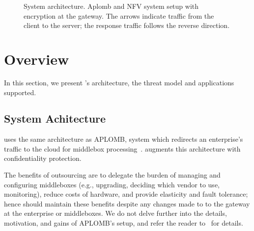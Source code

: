 
\begin{figure}[t!]
\centering
{}
%
\hfill  
{}
     
\caption{System architecture. Aplomb and NFV system setup with \sys encryption  at the gateway. The arrows indicate traffic from the client to the server; the response traffic follows the reverse direction. \label{fig:sys-overview}}
\end{figure}




     
\section{Overview}\label{sec:overview}








In this section, we present \sys's architecture, the threat model and applications supported.


\subsection{System Achitecture}

\sys uses the same  architecture as APLOMB, system which redirects an enterprise's traffic to the cloud for middlebox processing~\cite{aplomb}. \sys augments this architecture with confidentiality protection.

The benefits of outsourcing are to delegate the burden of managing and configuring
middleboxes (e.g., upgrading, deciding which vendor to use, monitoring), reduce costs of hardware,
and provide elasticity and fault tolerance; hence \sys should maintain these benefits despite any changes made to to the gateway at the enterprise or middleboxes.
We do not delve further into the details, motivation, and gains of APLOMB's setup, and refer the reader to~\cite{aplomb} for details. 

